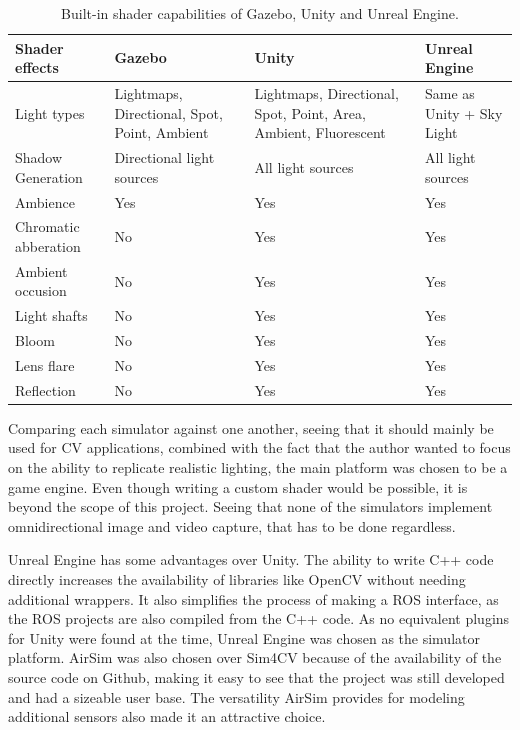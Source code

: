\begin{table}[!htb]
    \centering
    \caption{Built-in shader capabilities of Gazebo, Unity and Unreal Engine.}
    \label{tab:comparison_shader}
    \begin{tabular}{|>{\centering\arraybackslash}m{3cm}|>{\centering\arraybackslash}m{3.5cm}|>{\centering\arraybackslash}m{4cm}|>{\centering\arraybackslash}m{3.5cm}|} \hline
        \textbf{Shader effects} & \textbf{Gazebo} & \textbf{Unity} & \textbf{Unreal Engine} \\ \hline\hline
        Light types     & Lightmaps, Directional, Spot, Point, Ambient & Lightmaps, Directional, Spot, Point, Area, Ambient, Fluorescent & Same as Unity + Sky Light \\ \hline
        Shadow Generation & Directional light sources & All light sources & All light sources \\ \hline
        Ambience        & Yes & Yes & Yes \\ \hline
        Chromatic abberation & No & Yes & Yes \\ \hline
        Ambient occusion & No & Yes & Yes \\ \hline
        Light shafts    & No & Yes & Yes \\ \hline
        Bloom & No & Yes & Yes \\ \hline
        Lens flare & No & Yes & Yes \\ \hline
        Reflection      & No & Yes & Yes \\ \hline
    \end{tabular}
\end{table}

Comparing each simulator against one another, seeing that it should mainly be used for CV applications, combined with the fact that the author wanted to focus on the ability to replicate realistic lighting, the main platform was chosen to be a game engine. Even though writing a custom shader would be possible, it is beyond the scope of this project. Seeing that none of the simulators implement omnidirectional image and video capture, that has to be done regardless.

Unreal Engine has some advantages over Unity. The ability to write C++ code directly increases the availability of libraries like OpenCV without needing additional wrappers. It also simplifies the process of making a ROS interface, as the ROS projects are also compiled from the C++ code. As no equivalent plugins for Unity were found at the time, Unreal Engine was chosen as the simulator platform. AirSim was also chosen over Sim4CV because of the availability of the source code on Github, making it easy to see that the project was still developed and had a sizeable user base. The versatility AirSim provides for modeling additional sensors also made it an attractive choice.

